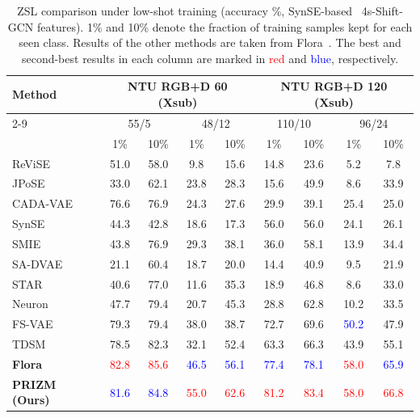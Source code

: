 \documentclass[11pt]{article}
\begin{document}
\begin{table}[htbp]
\centering
\caption{ZSL comparison under low-shot training (accuracy \%, SynSE-based~\cite{synse21} 4s-Shift-GCN features). 1\% and 10\% denote the fraction of training samples kept for each seen class. Results of the other methods are taken from Flora~\cite{flora26}. The best and second-best results in each column are marked in \textcolor{red}{red} and \textcolor{blue}{blue}, respectively.}
\label{tab:lowshot}
\small
\setlength{\tabcolsep}{4pt}
\newcommand{\best}[1]{\textcolor{red}{#1}}
\newcommand{\second}[1]{\textcolor{blue}{#1}}
\begin{tabular}{l|cc|cc|cc|cc}
\hline
\multirow{3}{*}{Method} & \multicolumn{4}{c|}{NTU RGB+D 60 (Xsub)} & \multicolumn{4}{c}{NTU RGB+D 120 (Xsub)} \\
\cline{2-9}
& \multicolumn{2}{c|}{55/5} & \multicolumn{2}{c|}{48/12} & \multicolumn{2}{c|}{110/10} & \multicolumn{2}{c}{96/24} \\
& 1\% & 10\% & 1\% & 10\% & 1\% & 10\% & 1\% & 10\% \\
\hline
ReViSE~\cite{reVISE17} & 51.0 & 58.0 & 9.8 & 15.6 & 14.8 & 23.6 & 5.2 & 7.8 \\
JPoSE~\cite{jpose19} & 33.0 & 62.1 & 23.8 & 28.3 & 15.6 & 49.9 & 8.6 & 33.9 \\
CADA-VAE~\cite{cadavae19} & 76.6 & 76.9 & 24.3 & 27.6 & 29.9 & 39.1 & 25.4 & 25.0 \\
SynSE~\cite{synse21} & 44.3 & 42.8 & 18.6 & 17.3 & 56.0 & 56.0 & 24.1 & 26.1 \\
SMIE~\cite{smie23} & 43.8 & 76.9 & 29.3 & 38.1 & 36.0 & 58.1 & 13.9 & 34.4 \\
SA-DVAE~\cite{savae24} & 21.1 & 60.4 & 18.7 & 20.0 & 14.4 & 40.9 & 9.5 & 21.9 \\
STAR~\cite{star24} & 40.6 & 77.0 & 11.6 & 35.3 & 18.9 & 46.8 & 8.6 & 33.0 \\
Neuron~\cite{neuron25} & 47.7 & 79.4 & 20.7 & 45.3 & 28.8 & 62.8 & 10.2 & 33.5 \\
FS-VAE~\cite{fsvae25} & 79.3 & 79.4 & 38.0 & 38.7 & 72.7 & 69.6 & \second{50.2} & 47.9 \\
TDSM~\cite{tdsm25} & 78.5 & 82.3 & 32.1 & 52.4 & 63.3 & 66.3 & 43.9 & 55.1 \\
\textbf{Flora}~\cite{flora26} & \best{82.8} & \best{85.6} & \second{46.5} & \second{56.1} & \second{77.4} & \second{78.1} & \best{58.0} & \second{65.9} \\
\hline
\textbf{PRIZM (Ours)} & \second{81.6} & \second{84.8} & \best{55.0} & \best{62.6} & \best{81.2} & \best{83.4} & \best{58.0} & \best{66.8} \\
\hline
\end{tabular}
\end{table}
\end{document}
